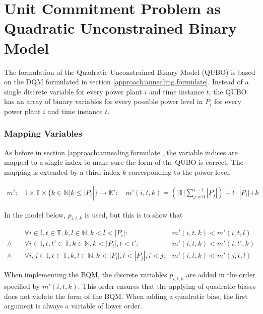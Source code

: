 \section{Unit Commitment Problem as Quadratic Unconstrained Binary Model}

The formulation of the Quadratic Unconstrained Binary Model (QUBO) is based on the DQM formulated in section \ref{approach:annealing.formulate}.
Instead of a single discrete variable for every power plant $i$ and time instance $t$, the QUBO has an array of binary variables for every possible power level in $P_i$ for every power plant $i$ and time instance $t$.

\subsubsection{Mapping Variables}

As before in section \ref{approach:annealing.formulate}, the variable indices are mapped to a single index to make sure the form of the QUBO is correct.
The mapping is extended by a third index $k$ corresponding to the power level.

\begin{align}
  m':
  \quad
  \mathbb{I}
  \times \mathbb{T}
  \times \{k \in \mathbb{N} | k \leq |P_i|\} \to \mathbb{K}':
  \quad
  m'(i, t, k) = \left( |\mathbb{T}| \sum_{j=0}^{i-1} |P_j| \right)
  + t \cdot |P_i|
  + k
\end{align}

In the model below, $p_{i,t,k}$ is used, but this is to show that

\begin{subequations}
\begin{align}
  &
  \forall i \in \mathbb{I}, t \in \mathbb{T}, k, l \in \mathbb{N}, k < l < |P_i|:
  &
  m'(i, t, k) < m'(i, t, l)
  \\
  \land \quad
  &
  \forall i \in \mathbb{I}, t, t' \in \mathbb{T}, k \in \mathbb{N}, k < |P_i|, t < t':
  &
  m'(i, t, k) < m'(i, t', k)
  \\
  \land \quad
  &
  \forall i, j \in \mathbb{I}, t  \in \mathbb{T}, k, l \in \mathbb{N}, k < |P_i|, l < |P_j|, i < j:
  &
  m'(i, t, k) < m'(j, t, l)
\end{align}
\end{subequations}

When implementing the BQM, the discrete variables $p_{i, t, k}$ are added in the order specified by $m'(i, t, k)$.
This order ensures that the applying of quadratic biases does not violate the form of the BQM.
When adding a quadratic bias, the first argument is always a variable of lower order.

